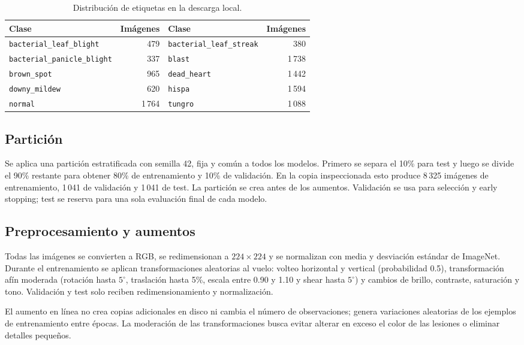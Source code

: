 \documentclass[11pt,a4paper]{article}
\begin{document}
\begin{table}[ht]
\centering
\small
\caption{Distribución de etiquetas en la descarga local.}
\begin{tabular}{lr@{\qquad}lr}
\toprule
Clase & Imágenes & Clase & Imágenes \\
\midrule
\texttt{bacterial\_leaf\_blight} & 479 & \texttt{bacterial\_leaf\_streak} & 380 \\
\texttt{bacterial\_panicle\_blight} & 337 & \texttt{blast} & 1\,738 \\
\texttt{brown\_spot} & 965 & \texttt{dead\_heart} & 1\,442 \\
\texttt{downy\_mildew} & 620 & \texttt{hispa} & 1\,594 \\
\texttt{normal} & 1\,764 & \texttt{tungro} & 1\,088 \\
\bottomrule
\end{tabular}
\end{table}

\subsection{Partición}
Se aplica una partición estratificada con semilla 42, fija y común a todos los modelos. Primero se separa el 10\% para test y luego se divide el 90\% restante para obtener 80\% de entrenamiento y 10\% de validación. En la copia inspeccionada esto produce 8\,325 imágenes de entrenamiento, 1\,041 de validación y 1\,041 de test. La partición se crea antes de los aumentos. Validación se usa para selección y early stopping; test se reserva para una sola evaluación final de cada modelo.

\subsection{Preprocesamiento y aumentos}
Todas las imágenes se convierten a RGB, se redimensionan a \(224\times224\) y se normalizan con media y desviación estándar de ImageNet. Durante el entrenamiento se aplican transformaciones aleatorias al vuelo: volteo horizontal y vertical (probabilidad 0.5), transformación afín moderada (rotación hasta \(5^\circ\), traslación hasta 5\%, escala entre 0.90 y 1.10 y shear hasta \(5^\circ\)) y cambios de brillo, contraste, saturación y tono. Validación y test solo reciben redimensionamiento y normalización.

El aumento en línea no crea copias adicionales en disco ni cambia el número de observaciones; genera variaciones aleatorias de los ejemplos de entrenamiento entre épocas. La moderación de las transformaciones busca evitar alterar en exceso el color de las lesiones o eliminar detalles pequeños.
\end{document}
